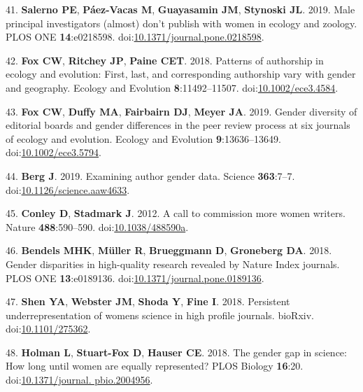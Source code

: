 \documentclass[11pt,]{article}
\begin{document}
\hypertarget{ref-Salerno2019}{}
41. \textbf{Salerno PE}, \textbf{Páez-Vacas M}, \textbf{Guayasamin JM},
\textbf{Stynoski JL}. 2019. Male principal investigators (almost) don't
publish with women in ecology and zoology. PLOS ONE
\textbf{14}:e0218598.
doi:\href{https://doi.org/10.1371/journal.pone.0218598}{10.1371/journal.pone.0218598}.

\hypertarget{ref-Fox2018}{}
42. \textbf{Fox CW}, \textbf{Ritchey JP}, \textbf{Paine CET}. 2018.
Patterns of authorship in ecology and evolution: First, last, and
corresponding authorship vary with gender and geography. Ecology and
Evolution \textbf{8}:11492--11507.
doi:\href{https://doi.org/10.1002/ece3.4584}{10.1002/ece3.4584}.

\hypertarget{ref-Fox2019}{}
43. \textbf{Fox CW}, \textbf{Duffy MA}, \textbf{Fairbairn DJ},
\textbf{Meyer JA}. 2019. Gender diversity of editorial boards and gender
differences in the peer review process at six journals of ecology and
evolution. Ecology and Evolution \textbf{9}:13636--13649.
doi:\href{https://doi.org/10.1002/ece3.5794}{10.1002/ece3.5794}.

\hypertarget{ref-berg_examining_2019}{}
44. \textbf{Berg J}. 2019. Examining author gender data. Science
\textbf{363}:7--7.
doi:\href{https://doi.org/10.1126/science.aaw4633}{10.1126/science.aaw4633}.

\hypertarget{ref-conley_call_2012-1}{}
45. \textbf{Conley D}, \textbf{Stadmark J}. 2012. A call to commission
more women writers. Nature \textbf{488}:590--590.
doi:\href{https://doi.org/10.1038/488590a}{10.1038/488590a}.

\hypertarget{ref-bendels_gender_2018}{}
46. \textbf{Bendels MHK}, \textbf{Müller R}, \textbf{Brueggmann D},
\textbf{Groneberg DA}. 2018. Gender disparities in high-quality research
revealed by Nature Index journals. PLOS ONE \textbf{13}:e0189136.
doi:\href{https://doi.org/10.1371/journal.pone.0189136}{10.1371/journal.pone.0189136}.

\hypertarget{ref-Shen275362}{}
47. \textbf{Shen YA}, \textbf{Webster JM}, \textbf{Shoda Y},
\textbf{Fine I}. 2018. Persistent underrepresentation of womens science
in high profile journals. bioRxiv.
doi:\href{https://doi.org/10.1101/275362}{10.1101/275362}.

\hypertarget{ref-holman_gender_2018}{}
48. \textbf{Holman L}, \textbf{Stuart-Fox D}, \textbf{Hauser CE}. 2018.
The gender gap in science: How long until women are equally represented?
PLOS Biology \textbf{16}:20.
doi:\href{https://doi.org/10.1371/journal.\%20pbio.2004956}{10.1371/journal. pbio.2004956}.
\end{document}
